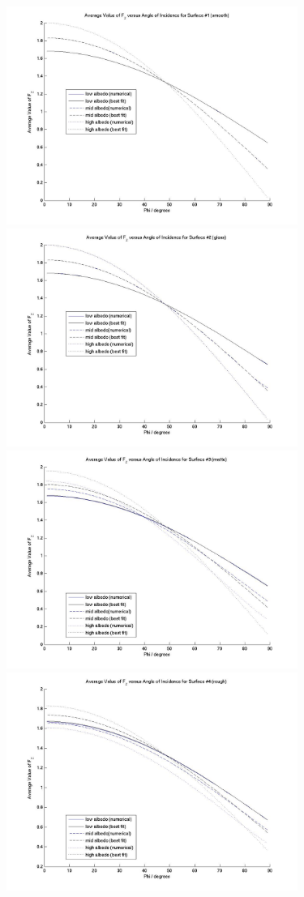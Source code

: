 \begin{description}
      \begin{figure}[!ht]
        \includegraphics[width=95mm]{figs/sda/F__z_diff_smooth.jpg}
        \includegraphics[width=95mm]{figs/sda/F__z_diff__gloss.jpg}
        \includegraphics[width=95mm]{figs/sda/F__z_diff__matte.jpg}
        \includegraphics[width=95mm]{figs/sda/F__z_diff__rough.jpg}

\end{figure}
\end{description}
